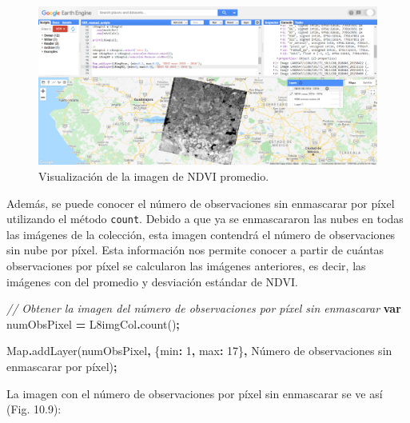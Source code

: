 \documentclass[
  12pt,
  letterpaper,
  twoside]{book}
\newenvironment{Shaded}{\begin{snugshade}}{\end{snugshade}}
\newcommand{\BuiltInTok}[1]{#1}
\newcommand{\CommentTok}[1]{\textcolor[rgb]{0.56,0.35,0.01}{\textit{#1}}}
\newcommand{\DataTypeTok}[1]{\textcolor[rgb]{0.13,0.29,0.53}{#1}}
\newcommand{\DecValTok}[1]{\textcolor[rgb]{0.00,0.00,0.81}{#1}}
\newcommand{\FunctionTok}[1]{\textcolor[rgb]{0.00,0.00,0.00}{#1}}
\newcommand{\KeywordTok}[1]{\textcolor[rgb]{0.13,0.29,0.53}{\textbf{#1}}}
\newcommand{\NormalTok}[1]{#1}
\newcommand{\OperatorTok}[1]{\textcolor[rgb]{0.81,0.36,0.00}{\textbf{#1}}}
\newcommand{\StringTok}[1]{\textcolor[rgb]{0.31,0.60,0.02}{#1}}
\begin{document}
\begin{figure}[btp]

{\centering \includegraphics[width=1\linewidth]{Img/imNDVI} 

}

\caption{Visualización de la imagen de NDVI promedio.}\label{fig:unnamed-chunk-172}
\end{figure}

Además, se puede conocer el número de observaciones sin enmascarar por píxel utilizando el método \texttt{count}. Debido a que ya se enmascararon las nubes en todas las imágenes de la colección, esta imagen contendrá el número de observaciones sin nube por píxel. Esta información nos permite conocer a partir de cuántas observaciones por píxel se calcularon las imágenes anteriores, es decir, las imágenes con del promedio y desviación estándar de NDVI.

\begin{Shaded}
\begin{Highlighting}[]
\CommentTok{// Obtener la imagen del número de observaciones por píxel sin enmascarar }
\KeywordTok{var}\NormalTok{ numObsPixel }\OperatorTok{=}\NormalTok{ L8imgCol}\OperatorTok{.}\FunctionTok{count}\NormalTok{()}\OperatorTok{;}

\BuiltInTok{Map}\OperatorTok{.}\FunctionTok{addLayer}\NormalTok{(numObsPixel}\OperatorTok{,}
\NormalTok{  \{}\DataTypeTok{min}\OperatorTok{:} \DecValTok{1}\OperatorTok{,} \DataTypeTok{max}\OperatorTok{:} \DecValTok{17}\NormalTok{\}}\OperatorTok{,}
  \StringTok{\textquotesingle{}Número de observaciones sin enmascarar por píxel\textquotesingle{}}\NormalTok{)}\OperatorTok{;}
\end{Highlighting}
\end{Shaded}

La imagen con el número de observaciones por píxel sin enmascarar se ve así (Fig. 10.9):
\end{document}
